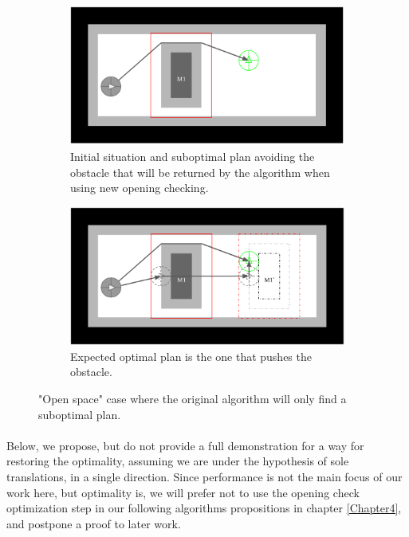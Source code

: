\begin{figure}[H]
\centering
\begin{subfigure}{.40\textwidth}
  \centering
  \includegraphics[width=\linewidth]{Figures/Check_New_Opening/openspace_original.png}
  \caption{Initial situation and suboptimal plan avoiding the obstacle that will be returned by the algorithm when using new opening checking.}
  \label{fig:openspace_original}
\end{subfigure}\hspace*{\fill}
\begin{subfigure}{.40\textwidth}
  \centering
  \includegraphics[width=\linewidth]{Figures/Check_New_Opening/openspace_optimal_path.png}
  \caption{Expected optimal plan is the one that pushes the obstacle.}
  \label{fig:openspace_optimal_path}
\end{subfigure}
\caption{"Open space" case where the original algorithm will only find a suboptimal plan.}
\label{fig:openspace_case}
\end{figure}

\paragraph{}\label{check_opening_solution} Below, we propose, but do not provide a full demonstration for a way for restoring the optimality, assuming we are under the hypothesis of sole translations, in a single direction. Since performance is not the main focus of our work here, but optimality is, we will prefer not to use the opening check optimization step in our following algorithms propositions in chapter \ref{Chapter4}, and postpone a proof to later work.

